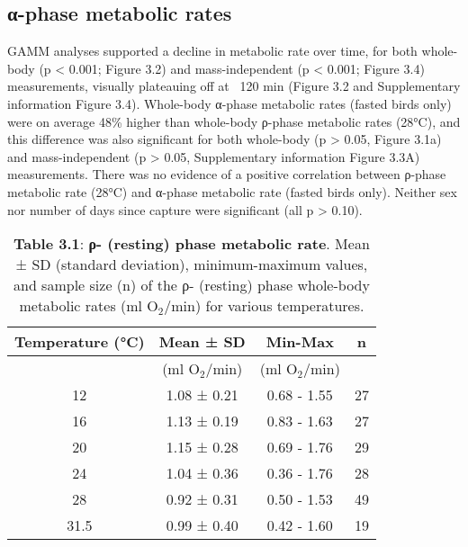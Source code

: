 \documentclass[10pt, twoside]{book} %
\begin{document}
\subsection{α-phase metabolic rates}
GAMM analyses supported a decline in metabolic rate over time, for both whole-body (p < 0.001; Figure 3.2) and mass-independent (p < 0.001; Figure 3.4) measurements, visually plateauing off at ~120 min (Figure 3.2 and Supplementary information Figure 3.4). Whole-body α-phase metabolic rates (fasted birds only) were on average 48\% higher than whole-body ρ-phase metabolic rates (28°C), and this difference was also significant for both whole-body (p > 0.05, Figure 3.1a) and mass-independent (p > 0.05, Supplementary information Figure 3.3A) measurements. There was no evidence of a positive correlation between ρ-phase metabolic rate (28°C) and α-phase metabolic rate (fasted birds only). Neither sex nor number of days since capture were significant (all p > 0.10).\\

\clearpage

\begin{table}[!ht]
    \centering
\small
\caption*{\textbf{Table 3.1}: \textbf{ρ- (resting) phase metabolic rate}. Mean ± SD (standard deviation), minimum-maximum values, and sample size (n) of the ρ- (resting) phase whole-body metabolic rates (ml O$_{\text{2}}$/min) for various temperatures.}
\begin{adjustbox}{max width=\textwidth}    
    \begin{tabular}{cccc}
    \hline
        Temperature (°C) & Mean ± SD & Min-Max & n \\ \hline
        ~ & (ml O$_{\text{2}}$/min) & (ml O$_{\text{2}}$/min) & ~ \\ 
        12 & 1.08 ± 0.21 & 0.68 - 1.55 & 27 \\ 
        16 & 1.13 ± 0.19 & 0.83 - 1.63 & 27 \\ 
        20 & 1.15 ± 0.28 & 0.69 - 1.76 & 29 \\ 
        24 & 1.04 ± 0.36 & 0.36 - 1.76 & 28 \\ 
        28 & 0.92 ± 0.31 & 0.50 - 1.53 & 49 \\ 
        31.5 & 0.99 ± 0.40 & 0.42 - 1.60 & 19 \\ \hline
    \end{tabular}
\end{adjustbox}
\end{table}

\clearpage
\end{document}
